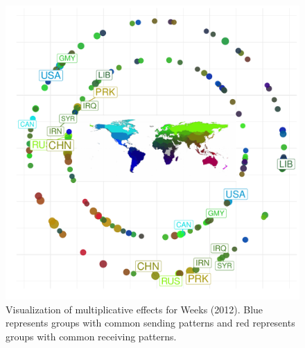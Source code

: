 \begin{figure}[!h]
	\includegraphics[width=\textwidth]{weeks_circPlot.pdf}
	\caption{\label{fig:weekscirc} Visualization of multiplicative effects for Weeks (2012). Blue represents groups with common sending patterns and red represents groups with common receiving patterns.}
\end{figure}
\FloatBarrier

